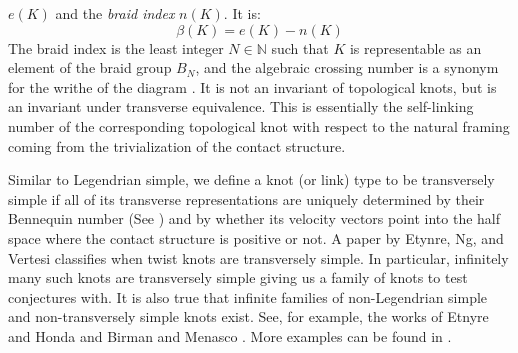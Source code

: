     $e(K)$ and the \textit{braid index} $n(K)$. It is:
    \begin{equation}
        \beta(K)=e(K)-n(K)
    \end{equation}
    The braid index is the least integer $N\in\mathbb{N}$ such that $K$
    is representable as an element of the braid group $B_{N}$, and the
    algebraic crossing number is a synonym for the writhe of the diagram
    \cite{KawamuroAlgCrossNumberAndBraidIndex}.
    It is not an invariant of topological knots, but is an invariant under
    transverse equivalence. This is essentially the self-linking number of
    the corresponding topological knot with respect to the natural framing
    coming from the trivialization of the contact structure.
    \par\hfill\par
    Similar to Legendrian simple, we define a knot
    (or link) type to be transversely simple if all of its transverse
    representations are uniquely determined by their Bennequin number
    (See \cite{BirmanWrinkleTransversallySimpleKnots}) and by whether its
    velocity vectors point into the half space where the contact structure
    is positive or not. A paper by Etynre, Ng, and Vertesi
    \cite{EtnyreEtAlLegendrianAndTransverseTwistKnots}
    classifies when twist knots are transversely simple. In
    particular, infinitely many such knots are transversely simple giving
    us a family of knots to test conjectures with. It is also true that
    infinite families of non-Legendrian simple and non-transversely simple
    knots exist. See, for example, the works of Etnyre and Honda
    \cite{EtnyreHondaCabling} and Birman and Menasco
    \cite{BirmanMenasco2006}. More examples can be found in
    \cite{Foldvari2019legnonsimple}.
